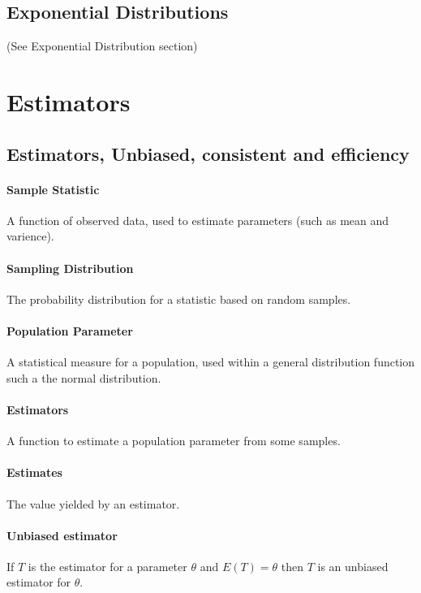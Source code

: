     \subsection{Exponential Distributions}
        (See Exponential Distribution section)

\section{Estimators}
    \subsection{Estimators, Unbiased, consistent and efficiency}
        \paragraph{Sample Statistic} A function of observed data, used to estimate parameters (such as mean and varience).

        \paragraph{Sampling Distribution} The probability distribution for a statistic based on random samples.

        \paragraph{Population Parameter} A statistical measure for a population, used within a general distribution function such a the normal distribution.

        \paragraph{Estimators} A function to estimate a population parameter from some samples.

        \paragraph{Estimates} The value yielded by an estimator.

        \paragraph{Unbiased estimator} If $T$ is the estimator for a parameter $\theta$ and $E(T) = \theta$ then $T$ is an unbiased estimator for $\theta$.

